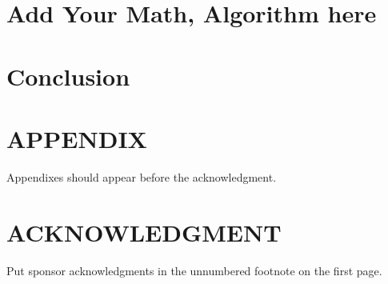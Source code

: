 \documentclass[journal]{IEEEtran}
\begin{document}
\section{Add Your Math, Algorithm here}

\section{Conclusion}

\section{APPENDIX}

Appendixes should appear before the acknowledgment.

\section{ACKNOWLEDGMENT}

Put sponsor acknowledgments in the unnumbered footnote on the first page.



\end{document}
